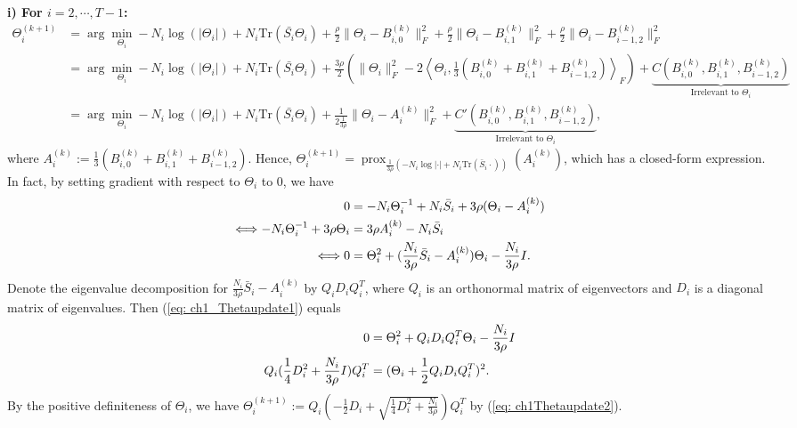 \textbf{i) For $i=2,\cdots,T-1$:} 
\begin{align*}
    \Theta_i^{(k+1)}&=\arg\min_{\Theta_i}-N_i\log(|\Theta_i|)+N_i\text{Tr}(\bar{S_i}\Theta_i)+\frac{\rho}{2}\|\Theta_i-B_{i,0}^{(k)}\|_F^2+\frac{\rho}{2}\|\Theta_i-B_{i,1}^{(k)}\|_F^2+\frac{\rho}{2}\|\Theta_{i}-B_{i-1,2}^{(k)}\|_F^2 \\
                    &=\arg\min_{\Theta_i}-N_i\log(|\Theta_i|)+N_i\text{Tr}(\bar{S_i}\Theta_i)+\frac{3\rho}{2}\left(\|\Theta_i\|_F^2-2\left\langle \Theta_i,\frac{1}{3}(B_{i,0}^{(k)}+B_{i,1}^{(k)}+B_{i-1,2}^{(k)})\right\rangle_F\right) + \underbrace{C(B_{i,0}^{(k)},B_{i,1}^{(k)},B_{i-1,2}^{(k)})}_{\text{Irrelevant to }\Theta_i} \\
                    &=\arg\min_{\Theta_i}-N_i\log(|\Theta_i|)+N_i\text{Tr}(\bar{S_i}\Theta_i)+\frac{1}{2\frac{1}{3\rho}}\|\Theta_i-A_i^{(k)}\|_F^2 + \underbrace{C'(B_{i,0}^{(k)},B_{i,1}^{(k)},B_{i-1,2}^{(k)})}_{\text{Irrelevant to }\Theta_i}, 
\end{align*}
where $A_i^{(k)}:=\frac{1}{3}(B_{i,0}^{(k)}+B_{i,1}^{(k)}+B_{i-1,2}^{(k)})$.
Hence, $\Theta_i^{(k+1)}=\operatorname{prox}_{\frac{1}{3\rho}(-N_i\log|\cdot|+N_i\text{Tr}(\bar{S}_i\cdot))}(A_i^{(k)})$, 
which has a closed-form expression. 
In fact, by setting gradient with respect to $\Theta_i$ to 0, we have 
\begin{align}
    \label{eq: ch1_Thetaupdate1}
    0 &= -N_i\Theta_i^{-1}+N_i\bar{S}_i+3\rho(\Theta_i-A_i^{(k)}) \notag \\
   \Longleftrightarrow -N_i\Theta_i^{-1} +3\rho\Theta_i &= 3\rho A_i^{(k)}-N_i\bar{S}_i \notag \\
   \Longleftrightarrow 0 &= \Theta_i^2 + (\frac{N_i}{3\rho}\bar{S}_i-A_i^{(k)})\Theta_i - \frac{N_i}{3\rho}I.
\end{align}
Denote the eigenvalue decomposition for $\frac{N_i}{3\rho}\bar{S}_i-A_i^{(k)}$ by $Q_iD_iQ_i^T$, 
where $Q_i$ is an orthonormal matrix of eigenvectors and $D_i$ is a diagonal matrix of eigenvalues. 
Then (\ref{eq: ch1_Thetaupdate1}) equals 
\begin{align}
    \label{eq: ch1Thetaupdate2}
    0 &= \Theta_i^2 + Q_iD_iQ_i^T\Theta_i - \frac{N_i}{3\rho}I \notag \\
    Q_i(\frac{1}{4}D_i^2+\frac{N_i}{3\rho}I)Q_i^T &= (\Theta_i+\frac{1}{2}Q_iD_iQ_i^T)^2.
\end{align}
By the positive definiteness of $\Theta_i$, 
we have $\Theta_i^{(k+1)}:=Q_i(-\frac{1}{2}D_i+\sqrt{\frac{1}{4}D_i^2+\frac{N_i}{3\rho}})Q_i^T$ by (\ref{eq: ch1Thetaupdate2}).

